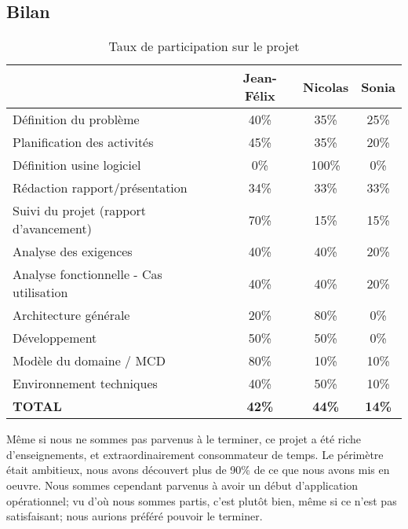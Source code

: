 \textcolor[RGB]{46, 116, 181}{\chapter{Bilan}}

\begin{table}[!h]
\centering
\begin{tabular}{|l|c|c|c|}
\hline
& \textbf{Jean-Félix} & \textbf{Nicolas} & \textbf{Sonia} \\ \hline
Définition du problème & 40\% & 35\% & 25\% \\
Planification des activités & 45\% & 35\% & 20\% \\
Définition usine logiciel & 0\% & 100\% & 0\% \\
Rédaction rapport/présentation & 34\% & 33\% & 33\% \\
Suivi du projet (rapport d'avancement) & 70\% & 15\% & 15\% \\
Analyse des exigences & 40\% & 40\% & 20\% \\
Analyse fonctionnelle - Cas utilisation & 40\% & 40\% & 20\% \\
Architecture générale & 20\% & 80\% & 0\% \\
Développement & 50\% & 50\% & 0\% \\
Modèle du domaine / MCD & 80\% & 10\% & 10\% \\
Environnement techniques & 40\% & 50\% & 10\% \\ \hline
\textbf{TOTAL} & \textbf{42\%} & \textbf{44\%} & \textbf{14\%} \\ \hline
\end{tabular}
\caption{\label{Participation}Taux de participation sur le projet}
\end{table}

Même si nous ne sommes pas parvenus à le terminer, ce projet a été riche d'enseignements, et extraordinairement consommateur de temps.
Le périmètre était ambitieux, nous avons découvert plus de 90\% de ce que nous avons mis en oeuvre. Nous sommes cependant parvenus à avoir un début d'application opérationnel; vu d'où nous sommes partis, c'est plutôt bien, même si ce n'est pas satisfaisant; nous aurions préféré pouvoir le terminer.
